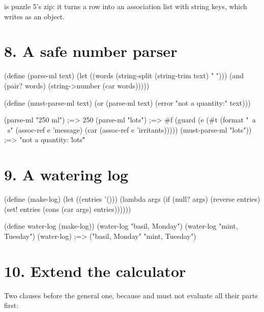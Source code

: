  is puzzle 5's zip: it turns a row into an
association list with string keys, which  writes as an
object.

\section*{8. A safe number parser}

\begin{scm}
(define (parse-ml text)
  (let ((words (string-split (string-trim text) " ")))
    (and (pair? words) (string->number (car words)))))

(define (must-parse-ml text)
  (or (parse-ml text) (error "not a quantity:" text)))

(parse-ml "250 ml")                     ;=> 250
(parse-ml "lots")                       ;=> #f
(guard (e (#t (format "~a ~s" (assoc-ref e 'message)
                                (car (assoc-ref e 'irritants)))))
  (must-parse-ml "lots"))               ;=> "not a quantity: \"lots\""
\end{scm}

\section*{9. A watering log}

\begin{scm}
(define (make-log)
  (let ((entries '()))
    (lambda args
      (if (null? args)
          (reverse entries)
          (set! entries (cons (car args) entries))))))

(define water-log (make-log))
(water-log "basil, Monday")
(water-log "mint, Tuesday")
(water-log)                 ;=> ("basil, Monday" "mint, Tuesday")
\end{scm}

\section*{10. Extend the calculator}

Two clauses before the general one, because  and  must
not evaluate all their parts first:

